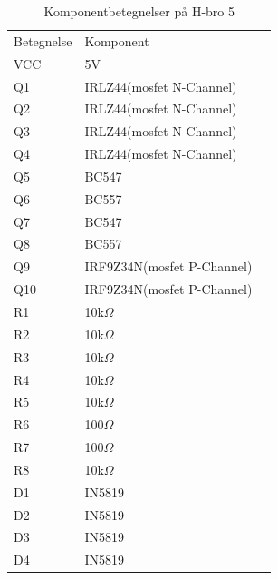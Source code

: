 \begin{table}[H]
	\centering
	\begin{tabular}{|l|l|l}
		\cline{1-2}
		Betegnelse 	& Komponent 	          	 &  \\ \cline{1-2}
		VCC        	& 5V                         &  \\ \cline{1-2}
		Q1   		& IRLZ44(mosfet N-Channel)   &  \\ \cline{1-2}
		Q2   		& IRLZ44(mosfet N-Channel)   &  \\ \cline{1-2}
		Q3   		& IRLZ44(mosfet N-Channel)   &  \\ \cline{1-2}
		Q4   		& IRLZ44(mosfet N-Channel)   &  \\ \cline{1-2}
		Q5   		& BC547                      &  \\ \cline{1-2}
		Q6   		& BC557                      &  \\ \cline{1-2}
		Q7   		& BC547                      &  \\ \cline{1-2}
		Q8   		& BC557                      &  \\ \cline{1-2}
		Q9   		& IRF9Z34N(mosfet P-Channel) &  \\ \cline{1-2}
		Q10  		& IRF9Z34N(mosfet P-Channel) &  \\ \cline{1-2}
		R1   		& 10k$\Omega$                &  \\ \cline{1-2}
		R2   		& 10k$\Omega$                &  \\ \cline{1-2}
		R3   		& 10k$\Omega$                &  \\ \cline{1-2}
		R4   		& 10k$\Omega$                &  \\ \cline{1-2}
		R5   		& 10k$\Omega$                &  \\ \cline{1-2}
		R6   		& 100$\Omega$                &  \\ \cline{1-2}
		R7   		& 100$\Omega$                &  \\ \cline{1-2}
		R8   		& 10k$\Omega$                &  \\ \cline{1-2}
		D1   		& IN5819                     &  \\ \cline{1-2}
		D2   		& IN5819                     &  \\ \cline{1-2}
		D3   		& IN5819                     &  \\ \cline{1-2}
		D4   		& IN5819                     &  \\ \cline{1-2}
	\end{tabular}
	\caption{Komponentbetegnelser på H-bro 5}
	\label{my-label}
\end{table}


